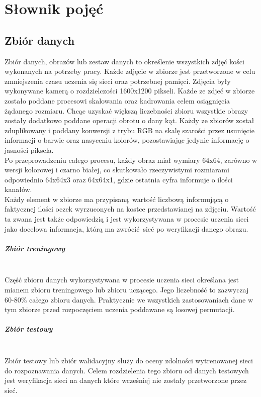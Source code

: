 
\chapter{Słownik pojęć}
\section{Zbiór danych}
Zbiór danych, obrazów lub zestaw danych to określenie wszystkich zdjęć kości wykonanych na
potrzeby pracy. Każde zdjęcie w zbiorze jest przetworzone w celu zmniejszenia czasu uczenia
się sieci oraz potrzebnej pamięci. Zdjęcia były wykonywane kamerą o rozdzielczości 1600x1200
pikseli. Każde ze zdjeć w zbiorze zostało poddane procesowi skalowania oraz kadrowania celem
osiągnięcia żądanego rozmiaru. Chcąc uzyskać większą liczebności zbioru wszystkie obrazy
zostały dodatkowo poddane operacji obrotu o dany kąt. Każdy ze zbiorów został zduplikowany
i poddany konwersji z trybu RGB na skalę szarości przez usunięcie informacji o barwie
oraz nasyceniu kolorów, pozostawiając jedynie informację o jasności piksela.\\
Po przeprowadzeniu całego procesu, każdy obraz miał wymiary 64x64, zarówno w wersji
kolorowej i czarno białej, co skutkowało rzeczywistymi rozmiarami odpowiednio 64x64x3
oraz 64x64x1, gdzie ostatnia cyfra informuje o ilości kanałów.\\
Każdy element w zbiorze ma przypisaną wartość liczbową informującą o faktycznej ilości
oczek wyrzuconych na kostce przedstawianej na zdjęciu. Wartość ta zwana jest także
odpowiedzią i jest wykorzystywana w procesie uczenia sieci jako docelowa informacja,
którą ma zwrócić sieć po weryfikacji danego obrazu.

\paragraph{Zbiór treningowy} \mbox{}\\
Część zbioru danych wykorzystywana w procesie uczenia sieci określana jest mianem zbioru
treningowego lub zbioru uczącego. Jego liczebność to zazwyczaj 60-80\% całego zbioru danych.
Praktycznie we wszystkich zastosowaniach dane w tym zbiorze przed rozpoczęciem uczenia
poddawane są losowej permutacji.

\paragraph{Zbiór testowy} \mbox{}\\
Zbiór testowy lub zbiór walidacyjny służy do oceny zdolności wytrenowanej sieci do
rozpoznawania danych. Celem rozdzielenia tego zbioru od danych testowych jest weryfikacja
sieci na danych które wcześniej nie zostały przetworzone przez sieć.

